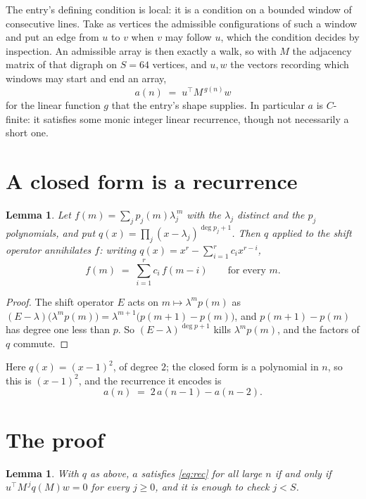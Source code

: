 \documentclass[11pt,a4paper]{article}
\theoremstyle{plain}
\newtheorem{lemma}[theorem]{Lemma}
\theoremstyle{definition}
\begin{document}
The entry's defining condition is local: it is a condition on a bounded window of consecutive lines. Take as vertices the
admissible configurations of such a window and put an edge from $u$ to $v$ when $v$ may
follow $u$, which the condition decides by inspection. An admissible array is then exactly a
walk, so with $M$ the adjacency matrix of that digraph on $S=64$ vertices, and $u,w$ the
vectors recording which windows may start and end an array,
\[
a(n)\;=\;u^{\!\top}M^{\,g(n)}w
\]
for the linear function $g$ that the entry's shape supplies. In particular $a$ is
$C$-finite: it satisfies some monic integer linear recurrence, though not necessarily a short
one.

\section{A closed form is a recurrence}

\begin{lemma}\label{lem:ann}
Let $f(m)=\sum_{j}p_j(m)\lambda_j^{\,m}$ with the $\lambda_j$ distinct and the $p_j$
polynomials, and put $q(x)=\prod_j(x-\lambda_j)^{\deg p_j+1}$. Then $q$ applied to the shift
operator annihilates $f$: writing $q(x)=x^{r}-\sum_{i=1}^{r}c_ix^{r-i}$,
\[
f(m)\;=\;\sum_{i=1}^{r}c_i\,f(m-i)\qquad\text{for every }m.
\]
\end{lemma}

\begin{proof}
The shift operator $E$ acts on $m\mapsto\lambda^{m}p(m)$ as
$(E-\lambda)\bigl(\lambda^{m}p(m)\bigr)=\lambda^{m+1}\bigl(p(m+1)-p(m)\bigr)$, and
$p(m+1)-p(m)$ has degree one less than $p$. So $(E-\lambda)^{\deg p+1}$ kills
$\lambda^{m}p(m)$, and the factors of $q$ commute.
\end{proof}

Here $q(x)=(x-1)^{2}$, of degree $2$; the closed form is a polynomial in $n$, so this is $(x-1)^{2}$, and the recurrence it encodes is
\begin{equation}\label{eq:rec}
a(n)\;=\;2\,a(n-1) - a(n-2).
\end{equation}

\section{The proof}

\begin{lemma}\label{lem:crit}
With $q$ as above, $a$ satisfies \eqref{eq:rec} for all large $n$ if and only if
$u^{\!\top}M^{\,j}q(M)w=0$ for every $j\ge0$, and it is enough to check $j<S$.
\end{lemma}
\end{document}
